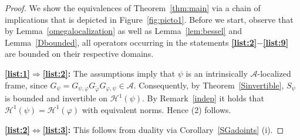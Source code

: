 \documentclass{amsart}
\def\Hil{\mathcal{H}}
\newcommand{\B}[0]{{\mathcal{B}}}
\newcommand{\A}[0]{{\mathcal{A}}}
\renewcommand{\H}{{\mathcal{H}}}
\begin{document}
\begin{proof} We show the equivalences of Theorem~\ref{thm:main} via a chain of implications that is depicted in Figure~\ref{fig:picto1}.
Before we start, observe that by Lemma~\ref{omegalocalization} as well as Lemma~\ref{lem:bessel} and Lemma~\ref{Dbounded}, all operators occurring in the statements \textbf{\ref{list:2}}$-$\textbf{\ref{list:9}} are bounded on their respective domains.\medskip

\textbf{\ref{list:1}$\Rightarrow$\ref{list:2}:} The assumptions imply that $\psi$ is an intrinsically $\A$-localized frame, since $G_{\psi} = G_{\psi,\varphi} G_{ \widetilde{\varphi}} G_{\varphi,\psi}  \in \A$. Consequently, by Theorem~\ref{Sinvertible}, $S_{\psi}$ is bounded and invertible on $\Hil^1(\psi)$. By Remark~\ref{indep} it holds that $\Hil^1(\psi) = \Hil^1(\varphi)$ with equivalent norms. Hence (2) follows.  
\medskip

\textbf{\ref{list:2}$\Leftrightarrow$\ref{list:3}:} This follows from duality via Corollary~\ref{SGadoints} (i).\medskip


\medskip


\end{proof}
\end{document}
